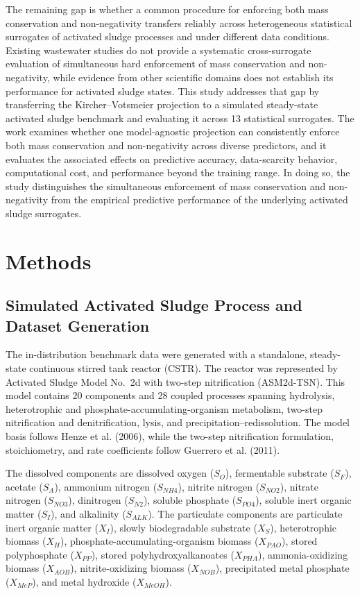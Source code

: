 \documentclass[a4paper,fleqn]{cas-sc}
\begin{document}
The remaining gap is whether a common procedure for enforcing both mass conservation and non-negativity transfers reliably across heterogeneous statistical surrogates of activated sludge processes and under different data conditions. Existing wastewater studies do not provide a systematic cross-surrogate evaluation of simultaneous hard enforcement of mass conservation and non-negativity, while evidence from other scientific domains does not establish its performance for activated sludge states. This study addresses that gap by transferring the Kircher--Votsmeier projection to a simulated steady-state activated sludge benchmark and evaluating it across 13 statistical surrogates. The work examines whether one model-agnostic projection can consistently enforce both mass conservation and non-negativity across diverse predictors, and it evaluates the associated effects on predictive accuracy, data-scarcity behavior, computational cost, and performance beyond the training range. In doing so, the study distinguishes the simultaneous enforcement of mass conservation and non-negativity from the empirical predictive performance of the underlying activated sludge surrogates.

\section{Methods}

\subsection{Simulated Activated Sludge Process and Dataset Generation}

The in-distribution benchmark data were generated with a standalone, steady-state continuous stirred tank reactor (CSTR). The reactor was represented by Activated Sludge Model No.\ 2d with two-step nitrification (ASM2d-TSN). This model contains 20 components and 28 coupled processes spanning hydrolysis, heterotrophic and phosphate-accumulating-organism metabolism, two-step nitrification and denitrification, lysis, and precipitation--redissolution. The model basis follows Henze et al. (2006), while the two-step nitrification formulation, stoichiometry, and rate coefficients follow Guerrero et al. (2011).

The dissolved components are dissolved oxygen ($S_O$), fermentable substrate ($S_F$), acetate ($S_A$), ammonium nitrogen ($S_{NH4}$), nitrite nitrogen ($S_{NO2}$), nitrate nitrogen ($S_{NO3}$), dinitrogen ($S_{N2}$), soluble phosphate ($S_{PO4}$), soluble inert organic matter ($S_I$), and alkalinity ($S_{ALK}$). The particulate components are particulate inert organic matter ($X_I$), slowly biodegradable substrate ($X_S$), heterotrophic biomass ($X_H$), phosphate-accumulating-organism biomass ($X_{PAO}$), stored polyphosphate ($X_{PP}$), stored polyhydroxyalkanoates ($X_{PHA}$), ammonia-oxidizing biomass ($X_{AOB}$), nitrite-oxidizing biomass ($X_{NOB}$), precipitated metal phosphate ($X_{MeP}$), and metal hydroxide ($X_{MeOH}$).
\end{document}

